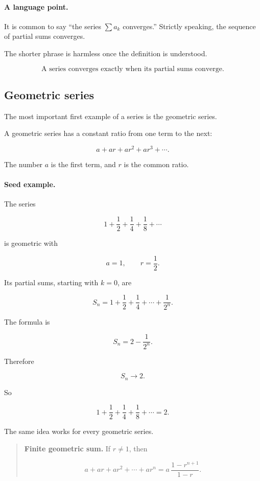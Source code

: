 \paragraph{A language point.}
It is common to say ``the series \(\sum a_k\) converges.''  Strictly speaking, the
sequence of partial sums converges.

The shorter phrase is harmless once the definition is understood.

\[
\boxed{
\text{A series converges exactly when its partial sums converge.}
}
\]

\subsection{Geometric series}
\label{subsec:geometric-series}

The most important first example of a series is the geometric series.

A geometric series has a constant ratio from one term to the next:

\[
a+ar+ar^2+ar^3+\cdots.
\]

The number \(a\) is the first term, and \(r\) is the common ratio.

\paragraph{Seed example.}
The series

\[
1+\frac12+\frac14+\frac18+\cdots
\]

is geometric with

\[
a=1,
\qquad
r=\frac12.
\]

Its partial sums, starting with \(k=0\), are

\[
S_n=1+\frac12+\frac14+\cdots+\frac1{2^n}.
\]

The formula is

\[
S_n=2-\frac1{2^n}.
\]

Therefore

\[
S_n\to2.
\]

So

\[
\boxed{
1+\frac12+\frac14+\frac18+\cdots=2.
}
\]

The same idea works for every geometric series.

\begin{quote}
\textbf{Finite geometric sum.}
If \(r\neq1\), then

\[
\boxed{
a+ar+ar^2+\cdots+ar^n
=
a\,\frac{1-r^{n+1}}{1-r}.
}
\]
\end{quote}

